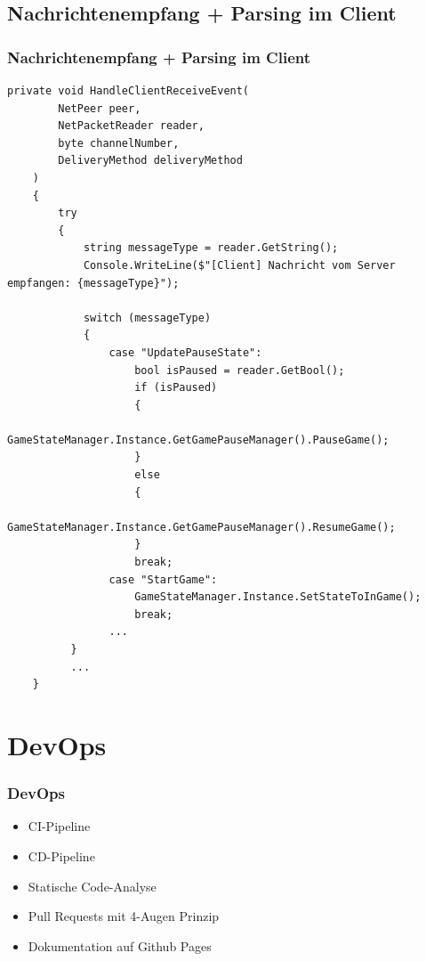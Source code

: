 \documentclass{beamer}
\begin{document}
\subsection{Nachrichtenempfang + Parsing im Client}
\begin{frame}[fragile]
\frametitle{Nachrichtenempfang + Parsing im Client}
  \begin{lstlisting}[language=CSharp, basicstyle=\ttfamily\tiny, breaklines=true]
     private void HandleClientReceiveEvent(
        NetPeer peer,
        NetPacketReader reader,
        byte channelNumber,
        DeliveryMethod deliveryMethod
    )
    {
        try
        {
            string messageType = reader.GetString();
            Console.WriteLine($"[Client] Nachricht vom Server empfangen: {messageType}");

            switch (messageType)
            {
                case "UpdatePauseState":
                    bool isPaused = reader.GetBool();
                    if (isPaused)
                    {
                        GameStateManager.Instance.GetGamePauseManager().PauseGame();
                    }
                    else
                    {
                        GameStateManager.Instance.GetGamePauseManager().ResumeGame();
                    }
                    break;
                case "StartGame":
                    GameStateManager.Instance.SetStateToInGame();
                    break;
                ...
          }
          ...
    }
  \end{lstlisting}
\end{frame}

\section{DevOps}
\begin{frame}
\frametitle{DevOps}
  \begin{itemize}
    \item CI-Pipeline
    \item CD-Pipeline
    \item Statische Code-Analyse
    \item Pull Requests mit 4-Augen Prinzip
    \item Dokumentation auf Github Pages
  \end{itemize}
\end{frame}
\end{document}
